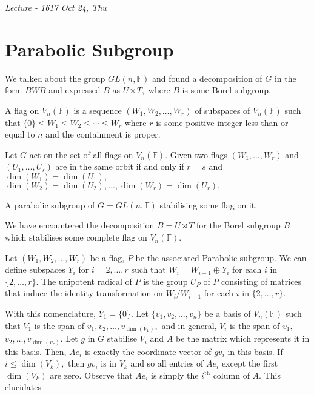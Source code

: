 
\noindent
\emph{Lecture - 16\hfill 17 Oct 24, Thu}

\section{Parabolic Subgroup}
We talked about the group $GL(n, \mathbb{F})$ and found a decomposition of 
$G$ in the form $BWB$ and expressed $B$ as $U \rtimes T,$ where $B$ is some
Borel subgroup.

\begin{definition}
	A flag on $V_n(\mathbb{F})$ is a sequence $(W_1, W_2, \dotsc, W_r)$ of 
	subspaces of $V_n(\mathbb{F})$ such that $\{0\} \leq W_1 \leq W_2 \leq
	\cdots \leq W_r$ where $r$ is some positive integer less than or equal to
	$n$ and the containment is proper.
\end{definition}
Let $G$ act on the set of all flags on $V_n(\mathbb{F}).$
Given two flags $(W_1, \dotsc, W_r)$ and $(U_1, \dotsc, U_s)$ are in the same orbit
if and only if $r = s$ and $\dim(W_1) = \dim(U_1),$ $\dim(W_2) = \dim(U_2),
\dotsc, \dim(W_r) = \dim(U_r).$
\begin{definition}
	A parabolic subgroup of $G = GL(n, \mathbb{F})$ stabilising some flag on 
	it.
\end{definition}
We have encountered the decomposition $B = U \rtimes T$ for the Borel subgroup
$B$ which stabilises some complete flag on $V_n(\mathbb{F}).$
\begin{definition}
	Let $(W_1, W_2, \dotsc, W_r)$ be a flag, $P$ be the associated Parabolic
	subgroup. We can define subspaces $Y_i$ for $i=2,\dotsc, r$ such that
	$W_i = W_{i-1} \oplus Y_i$ for each $i$ in $\{ 2, \dotsc, r\}.$ The 
	unipotent radical of $P$ is the group $U_P$ of $P$ consisting of matrices
	that induce the identity transformation on $W_i/W_{i-1}$ for each $i$
	in $\{2, \dotsc, r\}.$
\end{definition}
With this nomenclature, $Y_1 = \{0\}.$
Let $\{v_1, v_2, \dotsc, v_n\}$ be a basis of $V_n(\mathbb{F})$ such that
$V_1$ is the span of $v_1, v_2, \dotsc, v_{\dim(V_1)},$ and in general,
$V_i$ is the span of $v_1, $ $v_2, \dotsc, v_{\dim(v_r)}.$
Let $g$ in $G$ stabilise $V_i$ and $A$
be the matrix which represents it in this basis. Then, $A e_i$ is exactly the
coordinate vector of $g v_i$ in this basis. If $i \leq \dim(V_k),$ then $g v_i$
is in $V_k$ and so all entries of $A e_i$ except the first $\dim(V_k)$ are zero.
Observe that $A e_i$ is simply the $i^\text{th}$ column of $A.$ This elucidates
